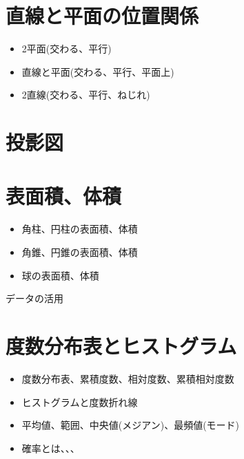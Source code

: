 \documentclass{jsarticle}
\begin{document}
\section{直線と平面の位置関係}
\begin{itemize}
\item 2平面(交わる、平行)
\item 直線と平面(交わる、平行、平面上)
\item 2直線(交わる、平行、ねじれ)
\end{itemize}

\section{投影図}

\section{表面積、体積}
\begin{itemize}
\item 角柱、円柱の表面積、体積
\item 角錐、円錐の表面積、体積
\item 球の表面積、体積
\end{itemize}

\newpage

{\LARGE \noindent データの活用}
\section{度数分布表とヒストグラム}
\begin{itemize}
\item 度数分布表、累積度数、相対度数、累積相対度数
\item ヒストグラムと度数折れ線
\item 平均値、範囲、中央値(メジアン)、最頻値(モード)
\item 確率とは、、、
\end{itemize}
\end{document}
